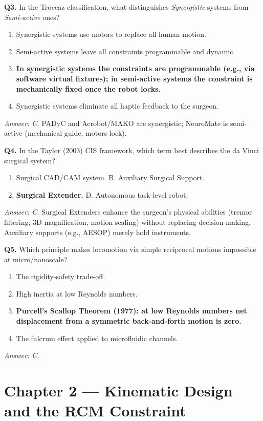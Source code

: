 \documentclass[11pt,a4paper,twoside]{report}
\begin{document}
\bigskip
\textbf{Q3.} In the Troccaz classification, what distinguishes \textit{Synergistic} systems from \textit{Semi-active} ones?
\begin{enumerate}[label=\Alph*.]
    \item Synergistic systems use motors to replace all human motion.
    \item Semi-active systems leave all constraints programmable and dynamic.
    \item \textbf{In synergistic systems the constraints are programmable (e.g., via software virtual fixtures); in semi-active systems the constraint is mechanically fixed once the robot locks.}
    \item Synergistic systems eliminate all haptic feedback to the surgeon.
\end{enumerate}
\textit{Answer: C.} PADyC and Acrobot/MAKO are synergistic; NeuroMate is semi-active (mechanical guide, motors lock).

\bigskip
\textbf{Q4.} In the Taylor (2003) CIS framework, which term best describes the da Vinci surgical system?
\begin{enumerate}[label=\Alph*.]
    \item Surgical CAD/CAM system. \quad B. Auxiliary Surgical Support.
    \item \textbf{Surgical Extender.} \quad D. Autonomous task-level robot.
\end{enumerate}
\textit{Answer: C.} Surgical Extenders enhance the surgeon's physical abilities (tremor filtering, 3D magnification, motion scaling) without replacing decision-making. Auxiliary supports (e.g., AESOP) merely hold instruments.

\bigskip
\textbf{Q5.} Which principle makes locomotion via simple reciprocal motions impossible at micro/nanoscale?
\begin{enumerate}[label=\Alph*.]
    \item The rigidity-safety trade-off.
    \item High inertia at low Reynolds numbers.
    \item \textbf{Purcell's Scallop Theorem (1977): at low Reynolds numbers net displacement from a symmetric back-and-forth motion is zero.}
    \item The fulcrum effect applied to microfluidic channels.
\end{enumerate}
\textit{Answer: C.}

\section{Chapter 2 — Kinematic Design and the RCM Constraint}
\end{document}
